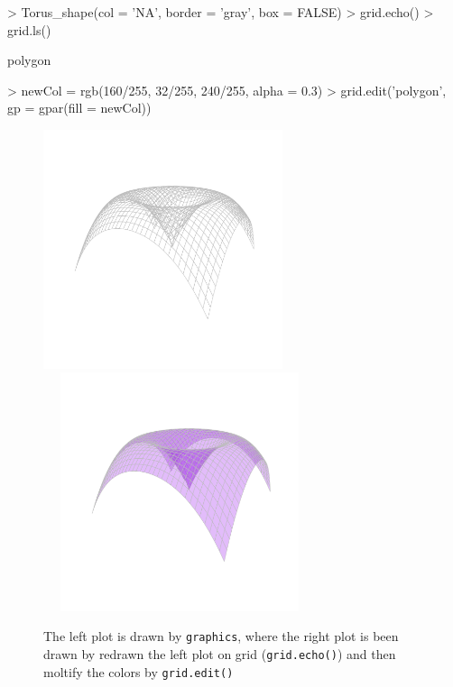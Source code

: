 \documentclass[paper=a4, fontsize=11pt]{report}
\begin{document}
\begin{Schunk}
\begin{Sinput}
> Torus_shape(col = 'NA', border = 'gray', box = FALSE)
> grid.echo()
> grid.ls()
\end{Sinput}
\begin{Soutput}
polygon
\end{Soutput}
\begin{Sinput}
> newCol = rgb(160/255, 32/255, 240/255, alpha = 0.3)
> grid.edit('polygon', gp = gpar(fill = newCol))
\end{Sinput}
\end{Schunk}

\begin{figure}[h]
\begin{center}
  \includegraphics[height = 7cm, width = 7cm]{figure/Chapter6_example_1_2.pdf}
  \includegraphics[height = 7cm, width = 8cm]{figure/Chapter6_example_1_3.pdf}
  \caption{The left plot is drawn by \texttt{graphics}, where the right plot is been drawn by redrawn the left plot on grid (\texttt{grid.echo()}) and then moltify the colors by \texttt{grid.edit()}}
  	\label{Example_6.3}
\end{center}
\end{figure}
\end{document}
